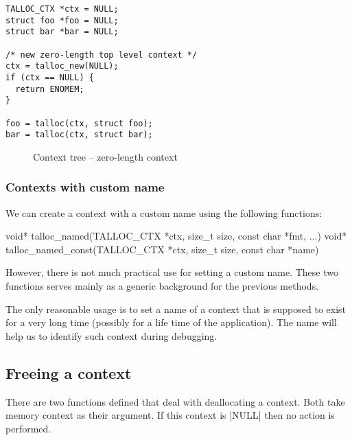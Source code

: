 \begin{lstlisting}[caption={talloc_new()},label=lst:talloc_new]
TALLOC_CTX *ctx = NULL;
struct foo *foo = NULL;
struct bar *bar = NULL;

/* new zero-length top level context */
ctx = talloc_new(NULL);
if (ctx == NULL) {
  return ENOMEM;
}

foo = talloc(ctx, struct foo);
bar = talloc(ctx, struct bar);
\end{lstlisting}

\begin{figure}[H]
  \centering
  
  \caption{Context tree -- zero-length context}
  \label{fig:context-tree-talloc-new}
\end{figure}

\subsubsection{Contexts with custom name}

We can create a context with a custom name using the following functions: 

\begin{funcproto}
void* talloc_named(TALLOC_CTX *ctx, size_t size,
                   const char *fmt, ...)
void* talloc_named_const(TALLOC_CTX *ctx, size_t size,
                         const char *name)
\end{funcproto}
\funclistend
However, there is not much practical use for setting a custom name. These two
functions serves mainly as a generic background for the previous methods.

The only reasonable usage is to set a name of a context that is supposed to
exist for a very long time (possibly for a life time of the application). The
name will help us to identify such context during debugging. 

\subsection{Freeing a context}
\label{talloc:subsec:free-context}

There are two functions defined that deal with deallocating a context. Both
take memory context as their argument. If this context is |NULL| then no action
is performed.


